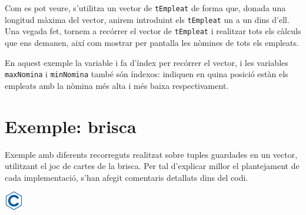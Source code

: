 \documentclass[
]{book}
\begin{document}
Com es pot veure, s'utilitza un vector de \texttt{tEmpleat} de forma que, donada una longitud màxima del vector, anirem introduint els \texttt{tEmpleat} un a un dins d'ell. Una vegada fet, tornem a recórrer el vector de \texttt{tEmpleat} i realitzar tots els càlculs que ens demanen, així com mostrar per pantalla les nòmines de tots els empleats.

En aquest exemple la variable i fa d'índex per recórrer el vector, i les variables \texttt{maxNomina} i \texttt{minNomina} també són índexos: indiquen en quina posició estàn els empleats amb la nòmina més alta i més baixa respectivament.

\hypertarget{exemple-brisca}{%
\section{Exemple: brisca}\label{exemple-brisca}}

Exemple amb diferents recorreguts realitzat sobre tuples guardades en un vector, utilitzant el joc de cartes de la brisca. Per tal d'explicar millor el plantejament de cada implementació, s'han afegit comentaris detallats dins del codi.

\includegraphics{./img/c.png}
\end{document}
